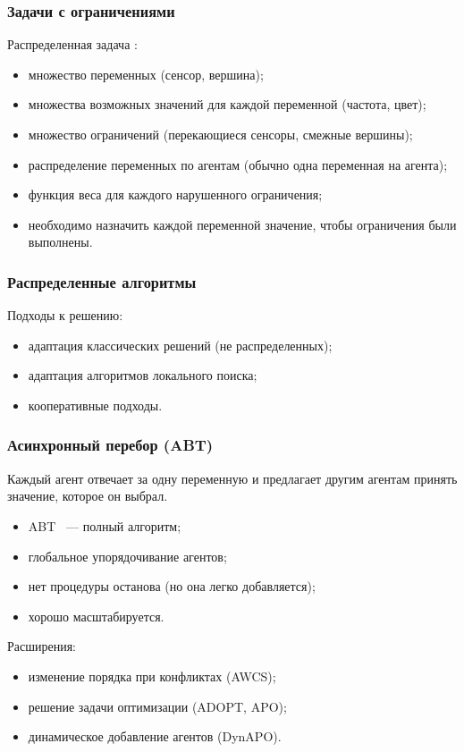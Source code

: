 \documentclass{beamer}
\begin{document}
\begin{frame}
  \frametitle{Задачи с ограничениями}
  Распределенная задача :
  \begin{itemize}
    \item<1-> множество переменных (сенсор, вершина);
    \item<2-> множества возможных значений для каждой переменной (частота, цвет);
    \item<3-> множество ограничений (перекающиеся сенсоры, смежные вершины);
    \item<4-> распределение переменных по агентам (обычно одна переменная на агента);
    \item<6-| alert@6> функция веса для каждого нарушенного ограничения;
    \item<5-> необходимо 
      {назначить каждой переменной значение, чтобы ограничения были выполнены}.
  \end{itemize}
\end{frame}

\begin{frame}
  \frametitle{Распределенные алгоритмы}
  Подходы к решению:

  \begin{itemize}
    \item адаптация классических решений (не распределенных);
    \item адаптация алгоритмов локального поиска;
    \item кооперативные подходы.
  \end{itemize}
\end{frame}

\begin{frame}
  \frametitle{Асинхронный перебор (ABT)}
  Каждый агент отвечает за одну переменную и предлагает другим агентам принять значение,
  которое он выбрал.
  \begin{itemize}
    \item ABT ~--- полный алгоритм;
    \item глобальное упорядочивание агентов;
    \item нет процедуры останова (но она легко добавляется);
    \item хорошо масштабируется.
  \end{itemize}

  Расширения:
  \begin{itemize}
    \item изменение порядка при конфликтах (AWCS);
    \item решение задачи оптимизации (ADOPT, APO);
    \item динамическое добавление агентов (DynAPO).
  \end{itemize}
\end{frame}
\end{document}
